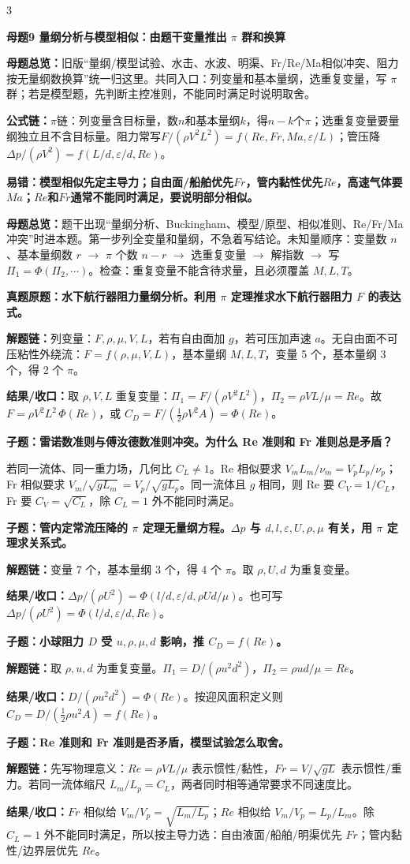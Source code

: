 \documentclass[a4paper]{article}
\newcommand{\mt}[1]{\vspace{0.12pt}\colorbox{M}{\parbox{\dimexpr\linewidth-2\fboxsep}{\color{white}\bfseries #1}}\par}
\newcommand{\qt}[1]{\vspace{0.04pt}\colorbox{Q}{\parbox{\dimexpr\linewidth-2\fboxsep}{\color{white}\bfseries #1}}\par}
\newcommand{\ans}[1]{\colorbox{G}{\parbox{\dimexpr\linewidth-2\fboxsep}{#1}}\par}
\newcommand{\warn}[1]{\colorbox{Y}{\parbox{\dimexpr\linewidth-2\fboxsep}{\color{E}\bfseries #1}}\par}
\newcommand{\chain}[1]{{\color{A}\bfseries 解题链：}#1\par}
\newcommand{\res}[1]{{\color{E}\bfseries 结果/收口：}#1\par}
\newcommand{\form}[1]{{\color{M}\bfseries 公式链：}#1\par}
\newcommand{\mview}[1]{\ans{\textbf{母题总览：}#1}}
\begin{document}
\begin{multicols}{3}
\mt{母题9 量纲分析与模型相似：由题干变量推出 $\pi$ 群和换算}
\mview{旧版“量纲/模型试验、水击、水波、明渠、Fr/Re/Ma相似冲突、阻力按无量纲数换算”统一归这里。共同入口：列变量和基本量纲，选重复变量，写 $\pi$ 群；若是模型题，先判断主控准则，不能同时满足时说明取舍。}
\form{$\pi$链：列变量含目标量，数$n$和基本量纲$k$，得$n-k$个$\pi$；选重复变量要量纲独立且不含目标量。阻力常写$F/(\rho V^2L^2)=f(Re,Fr,Ma,\varepsilon/L)$；管压降$\Delta p/(\rho V^2)=f(L/d,\varepsilon/d,Re)$。}
\warn{易错：模型相似先定主导力；自由面/船舶优先$Fr$，管内黏性优先$Re$，高速气体要$Ma$；$Re$和$Fr$通常不能同时满足，要说明部分相似。}
\mview{题干出现“量纲分析、Buckingham、模型/原型、相似准则、Re/Fr/Ma 冲突”时进本题。第一步列全变量和量纲，不急着写结论。未知量顺序：变量数 $n$、基本量纲数 $r$ $\to$ $\pi$ 个数 $n-r$ $\to$ 选重复变量 $\to$ 解指数 $\to$ 写 $\Pi_1=\Phi(\Pi_2,\cdots)$。检查：重复变量不能含待求量，且必须覆盖 $M,L,T$。}
\qt{真题原题：水下航行器阻力量纲分析。利用 $\pi$ 定理推求水下航行器阻力 $F$ 的表达式。}
\chain{列变量：$F,\rho,\mu,V,L$，若有自由面加 $g$，若可压加声速 $a$。无自由面不可压粘性外绕流：$F=f(\rho,\mu,V,L)$，基本量纲 $M,L,T$，变量 5 个，基本量纲 3 个，得 2 个 $\pi$。}
\res{取 $\rho,V,L$ 重复变量：$\Pi_1=F/(\rho V^2L^2)$，$\Pi_2=\rho VL/\mu=Re$。故 $F=\rho V^2L^2\,\Phi(Re)$，或 $C_D=F/(\frac12\rho V^2A)=\Phi(Re)$。}

\qt{子题：雷诺数准则与傅汝德数准则冲突。为什么 Re 准则和 Fr 准则总是矛盾？}
\ans{若同一流体、同一重力场，几何比 $C_L\ne1$。Re 相似要求 $V_mL_m/\nu_m=V_pL_p/\nu_p$；Fr 相似要求 $V_m/\sqrt{gL_m}=V_p/\sqrt{gL_p}$。同一流体且 $g$ 相同，则 Re 要 $C_V=1/C_L$，Fr 要 $C_V=\sqrt{C_L}$，除 $C_L=1$ 外不能同时满足。}

\qt{子题：管内定常流压降的 $\pi$ 定理无量纲方程。$\Delta p$ 与 $d,l,\varepsilon,U,\rho,\mu$ 有关，用 $\pi$ 定理求关系式。}
\chain{变量 7 个，基本量纲 3 个，得 4 个 $\pi$。取 $\rho,U,d$ 为重复变量。}
\res{$\Delta p/(\rho U^2)=\Phi(l/d,\varepsilon/d,\rho Ud/\mu)$。也可写 $\Delta p/(\rho U^2)=\Phi(l/d,\varepsilon/d,Re)$。}

\qt{子题：小球阻力 $D$ 受 $u,\rho,\mu,d$ 影响，推 $C_D=f(Re)$。}
\chain{取 $\rho,u,d$ 为重复变量。$\Pi_1=D/(\rho u^2d^2)$，$\Pi_2=\rho ud/\mu=Re$。}
\res{$D/(\rho u^2d^2)=\Phi(Re)$。按迎风面积定义则 $C_D=D/(\frac12\rho u^2A)=f(Re)$。}

\qt{子题：Re 准则和 Fr 准则是否矛盾，模型试验怎么取舍。}
\chain{先写物理意义：$Re=\rho VL/\mu$ 表示惯性/黏性，$Fr=V/\sqrt{gL}$ 表示惯性/重力。若同一流体缩尺 $L_m/L_p=C_L$，两者同时相等通常要求不同速度比。}
\res{$Fr$ 相似给 $V_m/V_p=\sqrt{L_m/L_p}$；$Re$ 相似给 $V_m/V_p=L_p/L_m$。除 $C_L=1$ 外不能同时满足，所以按主导力选：自由液面/船舶/明渠优先 $Fr$；管内黏性/边界层优先 $Re$。}


\end{multicols}
\end{document}

